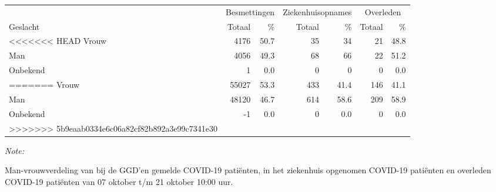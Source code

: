 \documentclass[
  english,
  man,floatsintext]{apa6}
\begin{document}
\begin{table}[H]
\centering\begingroup\fontsize{11}{13}\selectfont

\begin{threeparttable}
\begin{tabular}{lrrrrrr}
\toprule
\multicolumn{1}{c}{ } & \multicolumn{2}{c}{Besmettingen} & \multicolumn{2}{c}{Ziekenhuisopnames} & \multicolumn{2}{c}{Overleden} \\
\cmidrule(l{3pt}r{3pt}){2-3} \cmidrule(l{3pt}r{3pt}){4-5} \cmidrule(l{3pt}r{3pt}){6-7}
Geslacht & Totaal & \% & Totaal & \% & Totaal & \%\\
\midrule
<<<<<<< HEAD
Vrouw & 4176 & 50.7 & 35 & 34 & 21 & 48.8\\
Man & 4056 & 49.3 & 68 & 66 & 22 & 51.2\\
Onbekend & 1 & 0.0 & 0 & 0 & 0 & 0.0\\
=======
Vrouw & 55027 & 53.3 & 433 & 41.4 & 146 & 41.1\\
Man & 48120 & 46.7 & 614 & 58.6 & 209 & 58.9\\
Onbekend & -1 & 0.0 & 0 & 0.0 & 0 & 0.0\\
>>>>>>> 5b9eaab0334e6c06a82cf82b892a3e99c7341e30
\bottomrule
\end{tabular}
\begin{tablenotes}
\item \textit{Note: } 
\item Man-vrouwverdeling van bij de GGD’en gemelde COVID-19 patiënten, in het ziekenhuis opgenomen COVID-19 patiënten en overleden COVID-19 patiënten van 07 oktober t/m 21 oktober 10:00 uur.
\end{tablenotes}
\end{threeparttable}
\endgroup{}
\end{table}
\newpage
\end{document}
